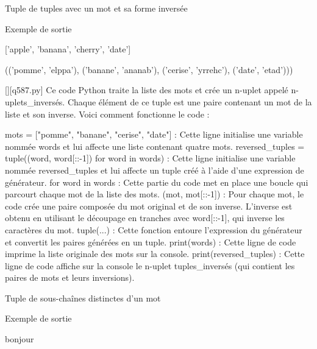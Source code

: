        \question
        Tuple de tuples avec un mot et sa forme inversée

Exemple de sortie

['apple', 'banana', 'cherry', 'date']

(('pomme', 'elppa'), ('banane', 'ananab'), ('cerise', 'yrrehc'), ('date', 'etad')))
        \par
        \begin{solution}
            \renewcommand{\nomfichier}{q587.py}
            \pythonfile{\chemincode \nomfichier}[][\nomfichier]
            Ce code Python traite la liste des mots et crée un n-uplet appelé n-uplets_inversés. Chaque élément de ce tuple est une paire contenant un mot de la liste et son inverse. Voici comment fonctionne le code :

    mots = ["pomme", "banane", "cerise", "date"] : Cette ligne initialise une variable nommée words et lui affecte une liste contenant quatre mots.
    reversed_tuples = tuple((word, word[::-1]) for word in words) : Cette ligne initialise une variable nommée reversed_tuples et lui affecte un tuple créé à l'aide d'une expression de générateur.
        for word in words : Cette partie du code met en place une boucle qui parcourt chaque mot de la liste des mots.
        (mot, mot[::-1]) : Pour chaque mot, le code crée une paire composée du mot original et de son inverse. L'inverse est obtenu en utilisant le découpage en tranches avec word[::-1], qui inverse les caractères du mot.
        tuple(...) : Cette fonction entoure l'expression du générateur et convertit les paires générées en un tuple.
    print(words) : Cette ligne de code imprime la liste originale des mots sur la console.
    print(reversed_tuples) : Cette ligne de code affiche sur la console le n-uplet tuples_inversés (qui contient les paires de mots et leurs inversions).
        \end{solution}
        

        \question
        Tuple de sous-chaînes distinctes d'un mot

Exemple de sortie

bonjour

